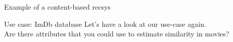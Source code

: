 \documentclass[compress]{beamer}
\begin{document}
\begin{frame}{Example of a content-based recsys}
\end{frame}





\begin{frame}{Use case: ImDb database}
Let's have a look at our use-case again. \\
Are there attributes that you could use to estimate similarity in movies?
\end{frame}
\end{document}
